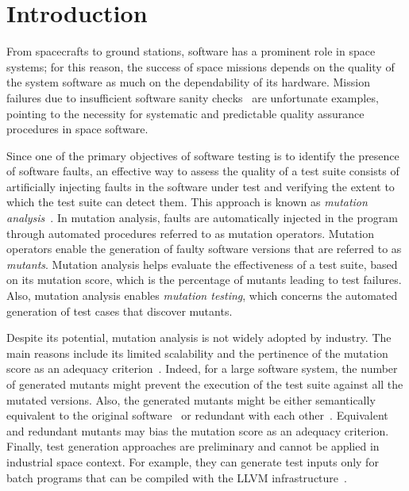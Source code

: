 
\section{Introduction}
\label{sec:introduction}


From spacecrafts to ground stations, software has a prominent role in space systems; for this reason, the success of space missions depends on the quality of the system software as much on the dependability of its hardware. Mission failures due to insufficient software sanity checks~\cite{Schiaparelli} are unfortunate examples, pointing to the necessity for systematic and predictable quality assurance procedures in space software.


Since one of the primary objectives of software testing is to identify the presence of software faults, an effective way to assess the quality of a test suite consists of artificially injecting faults in the software under test and verifying the extent to which the test suite can detect them.
This approach is known as \emph{mutation analysis}~\cite{DeMillo78}.
In mutation analysis, faults are automatically injected in the program through automated procedures referred to as mutation operators. Mutation operators enable the generation of faulty software versions that are referred to as \emph{mutants}.
Mutation analysis helps evaluate the effectiveness of a test suite,  based on its mutation score, which is the percentage of mutants leading to test failures. Also, mutation analysis enables \emph{mutation testing}, which concerns the automated generation of test cases that discover mutants.

Despite its potential, mutation analysis is not widely adopted by industry. The main reasons include its limited scalability and the pertinence of the mutation score as an adequacy criterion~\cite{papadakis2016threats}. Indeed, for a large software system, the number of generated mutants might prevent the execution of the test suite against all the mutated versions. Also, the generated mutants might be either
semantically equivalent to the original software~\cite{madeyski2013overcoming} or redundant with each other~\cite{Shin:TSE:DCriterion:2018}. Equivalent and redundant mutants may bias the mutation score as an adequacy criterion.
Finally, test generation approaches are preliminary and cannot be applied in industrial space context. For example, they can generate test inputs only for batch programs that can be compiled with the LLVM infrastructure~\cite{chekam2021killing}.


